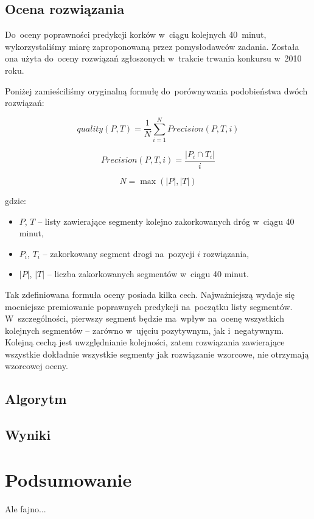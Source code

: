 \documentclass[a4paper,12pt]{mwart}
\begin{document}
\subsection{Ocena rozwiązania}

Do~oceny poprawności predykcji korków w~ciągu kolejnych 40~minut, wykorzystaliśmy miarę zaproponowaną przez pomysłodawców zadania. Została ona użyta do~oceny rozwiązań zgłoszonych w~trakcie trwania konkursu w~2010 roku.

Poniżej zamieściliśmy oryginalną formułę do~porównywania podobieństwa dwóch rozwiązań:

\[quality(P, T) = \frac{1}{N}\sum_{i = 1}^N Precision(P, T, i)\]

\[Precision(P, T, i) = \frac{\left | P_i \cap T_i \right |}{i}\]

\[N = \max (\left | P \right |, \left | T \right |)\]

gdzie:

\begin{itemize}
\item $P$, $T$ -- listy zawierające segmenty kolejno zakorkowanych dróg w~ciągu 40 minut,
\item $P_i$, $T_i$ -- zakorkowany segment drogi na~pozycji $i$ rozwiązania,
\item $\left | P \right |$, $\left | T \right |$ -- liczba zakorkowanych segmentów w~ciągu 40 minut.
\end{itemize}

Tak zdefiniowana formuła oceny posiada kilka cech. Najważniejszą wydaje się mocniejsze premiowanie poprawnych predykcji na~początku listy segmentów. W~szczególności, pierwszy segment będzie ma~wpływ na~ocenę wszystkich kolejnych segmentów -- zarówno w~ujęciu pozytywnym, jak i~negatywnym. Kolejną cechą jest uwzględnianie kolejności, zatem rozwiązania zawierające wszystkie dokładnie wszystkie segmenty jak rozwiązanie wzorcowe, nie otrzymają wzorcowej oceny.

\subsection{Algorytm}

\subsection{Wyniki}

\section{Podsumowanie}
Ale fajno...
\end{document}
